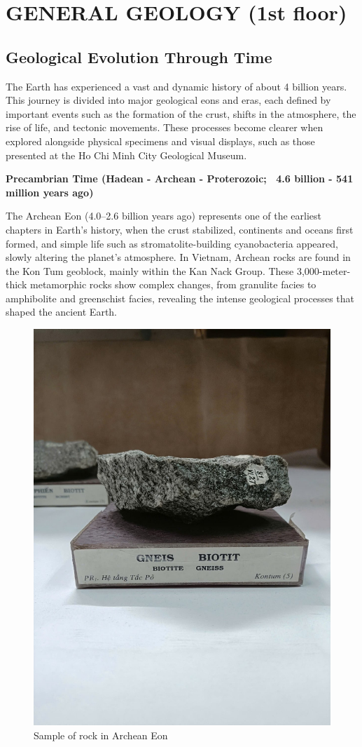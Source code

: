 \section{GENERAL GEOLOGY (1st floor)}
\label{sec:general-geology}

\subsection{Geological Evolution Through Time}
\label{subsec:geological-evolution}

The Earth has experienced a vast and dynamic history of about 4 billion years. This journey is divided into major geological eons and eras, each defined by important events such as the formation of the crust, shifts in the atmosphere, the rise of life, and tectonic movements. These processes become clearer when explored alongside physical specimens and visual displays, such as those presented at the Ho Chi Minh City Geological Museum.

\textbf{Precambrian Time (Hadean - Archean - Proterozoic; ~4.6 billion - 541 million years ago)}

The Archean Eon (4.0–2.6 billion years ago) represents one of the earliest chapters in Earth's history, when the crust stabilized, continents and oceans first formed, and simple life such as stromatolite-building cyanobacteria appeared, slowly altering the planet's atmosphere. In Vietnam, Archean rocks are found in the Kon Tum geoblock, mainly within the Kan Nack Group. These 3,000-meter-thick metamorphic rocks show complex changes, from granulite facies to amphibolite and greenschist facies, revealing the intense geological processes that shaped the ancient Earth.

\begin{figure}[H]
  \centering
  \includegraphics[max width=0.8\linewidth]{graphics/figure_02.jpg}
  \caption{Sample of rock in Archean Eon}
  \label{fig:archean-rock}
\end{figure}

